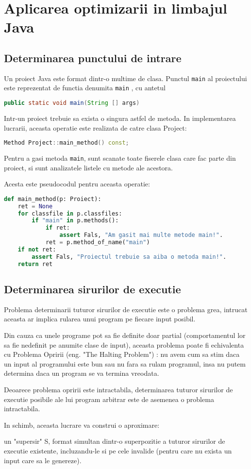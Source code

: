 \section{Aplicarea optimizarii in limbajul Java}

\subsection{Determinarea punctului de intrare}

Un proiect Java este format dintr-o multime de clasa.
Punctul \texttt{main} al proiectului este reprezentat de functia
denumita \texttt{main} \cite{java_main}, cu antetul

\begin{lstlisting}[language=Java]
public static void main(String [] args)
\end{lstlisting}

Intr-un proiect trebuie sa exista o singura astfel de metoda.
In implementarea lucrarii, aceasta operatie este realizata de
catre clasa Project:
\begin{lstlisting}[language=C++]
Method Project::main_method() const;
\end{lstlisting}

Pentru a gasi metoda \texttt{main}, sunt scanate toate fiserele
clasa care fac parte din proiect, si sunt analizatele listele cu
metode ale acestora.

Acesta este pseudocodul pentru aceasta operatie:
\begin{lstlisting}[language=Python]
def main_method(p: Proiect):
    ret = None
    for classfile in p.classfiles:
        if "main" in p.methods():
            if ret:
                assert Fals, "Am gasit mai multe metode main!".
            ret = p.method_of_name("main")
    if not ret:
        assert Fals, "Proiectul trebuie sa aiba o metoda main!".
    return ret
\end{lstlisting}

\subsection{Determinarea sirurilor de executie}

Problema determinarii tuturor sirurilor de executie este o
problema grea, intrucat aceasta ar implica rularea unui program
pe fiecare input posibil.

Din cauza ca unele programe pot sa fie definite doar partial
(comportamentul lor sa fie nedefinit pe anumite clase de input),
aceasta problema poate fi echivalenta cu Problema Opririi (eng. "The
Halting Problem") \cite{the_halting_problem}: nu avem cum sa stim
daca un input al programului este bun sau nu fara sa rulam
programul, insa nu putem determina daca un program se va termina
vreodata.

Deoarece problema opririi este intractabila, determinarea tuturor
sirurilor de executie posibile ale lui program arbitrar este de
asemenea o problema intractabila.

In schimb, aceasta lucrare va construi o aproximare:

un "supersir" S, format simultan dintr-o superpozitie a tuturor
sirurilor de executie existente, incluzandu-le si pe cele
invalide (pentru care nu exista un input care sa le genereze).
